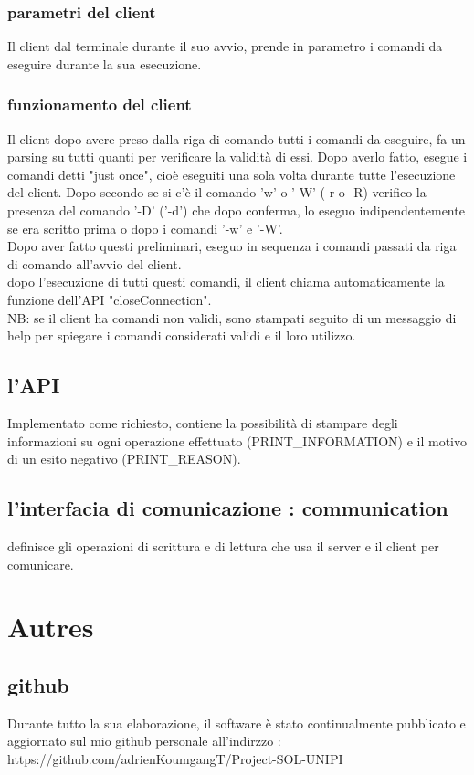 \documentclass[a4paper, 10pt]{report}
\begin{document}
	\subsection{parametri del client}
	
	Il client dal terminale durante il suo avvio, prende in parametro i comandi da eseguire durante la sua esecuzione.
	
	\subsection{funzionamento del client}
	
	Il client dopo avere preso dalla riga di comando tutti i comandi da eseguire, fa un parsing su tutti quanti per verificare la validità di essi. Dopo averlo fatto, esegue i comandi detti "just once", cioè eseguiti una sola volta durante tutte l'esecuzione del client. Dopo secondo se si c'è il comando 'w' o '-W' (-r o -R) verifico la presenza del comando '-D' ('-d') che dopo conferma, lo eseguo indipendentemente se era scritto prima o dopo i comandi '-w' e '-W'. \\
	Dopo aver fatto questi preliminari, eseguo in sequenza i comandi passati da riga di comando all'avvio del client. \\
	dopo l'esecuzione di tutti questi comandi, il client chiama automaticamente la funzione dell'API "closeConnection".\\
	
	NB: se il client ha comandi non validi, sono stampati seguito di un messaggio di help per spiegare i comandi considerati validi e il loro utilizzo.
	
	\section{l'API}
	
	Implementato come richiesto, contiene la possibilità di stampare degli informazioni su ogni operazione effettuato (PRINT\_INFORMATION) e il motivo di un esito negativo (PRINT\_REASON).
	
	\section{l'interfacia di comunicazione : communication}
	
	definisce gli operazioni di scrittura e di lettura che usa il server e il client per comunicare.
	
	\chapter{Autres}
	
	\section{github}
	
	Durante tutto la sua elaborazione, il software è stato continualmente pubblicato e aggiornato sul mio github personale all'indirzzo : https://github.com/adrienKoumgangT/Project-SOL-UNIPI
	
\end{document}
